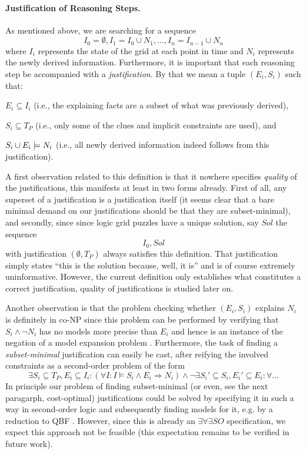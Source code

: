 \paragraph{Justification of Reasoning Steps.}
As mentioned above, we are searching for a sequence 
\[ I_0 = \emptyset, I_1 = I_0 \cup N_1, \dots , I_n = I_{n-1}\cup N_n\]
where $I_i$ represents the state of the grid at each point in time and $N_i$ represents the newly derived information. 
Furthermore, it is important that each reasoning step be accompanied with a \emph{justification}. By that we mean a tuple $(E_i,S_i)$ such that: 
\begin{compactitem}
	\item $E_i\subseteq I_i$ (i.e., the explaining facts are a subset of what was previously derived),
	\item $S_i \subseteq T_P$ (i.e., only some of the clues and implicit constraints are used), and 
	\item $S_i \cup E_i \models N_i$ (i.e., all newly derived information indeed follows from this justification).
\end{compactitem}
A first observation related to this definition is that it nowhere specifies \emph{quality} of the justifications, this manifests at least in two forms already. First of all, any superset of a justification is a justification itself (it seems clear that a bare minimal demand on our justifications should be that they are subset-minimal), and secondly, since since logic grid puzzles have a unique solution, say $Sol$ the sequence 
\[I_0, Sol\]
with justification $(\emptyset,T_P)$ always satisfies this definition. That justification simply states ``this is the solution because, well, it is'' and is of course extremely uninformative. However, the current definition only establishes what constitutes a correct justification, quality of justifications is studied later on. 

Another observation is that the problem checking whether $(E_i,S_i)$ explains $N_i$ is definitely in co-NP since this problem can be performed by verifying that $S_i \land \lnot N_i$ has no models more precise than $E_i$ and hence is an instance of the negation of a model expansion problem \cite{ternovskaMXcomplexity}. 
Furthermore, the task of finding a \emph{subset-minimal} justification can easily be cast, after reifying the involved constraints as a second-order problem of the form
\[\exists S_i\subseteq T_P, E_i\subseteq I_i: (\forall I: I\models S_i\land E_i \Rightarrow N_i) \land \lnot \exists S_i'\subseteq S_i, E_i'\subseteq E_i: \forall ... \]
In principle our problem of finding subset-minimal (or even, see the next paragarph, cost-optimal) justifications could be solved by specifying it in such a way in second-order logic and subsequently finding models for it, e.g. by a reduction to QBF \cite{kr/BogaertsTS16,kr/vanderHallenJ18}. 
However, since this is already an $\exists\forall\exists SO$ specification, we expect this approach not be feasible (this expectation remains to be verified in future work). 



